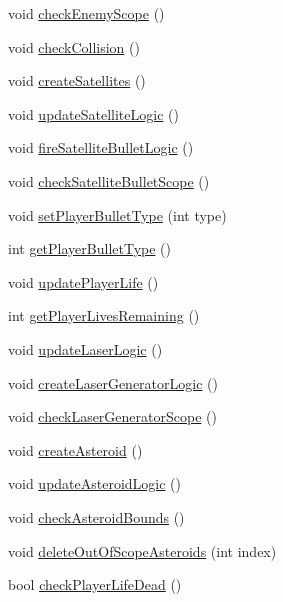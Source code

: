 \begin{DoxyCompactItemize}
\item 
void \hyperlink{class_game_logic_a5c0dc59099b2e223c99fc4a4d51627f0}{check\+Enemy\+Scope} ()
\item 
void \hyperlink{class_game_logic_a2ff25304164107a3f4549f108db95a23}{check\+Collision} ()
\item 
void \hyperlink{class_game_logic_ab2b56581a56239bb837e6eeea0a2991d}{create\+Satellites} ()
\item 
void \hyperlink{class_game_logic_a7d3db89e4d9438756e01b203341dc7c0}{update\+Satellite\+Logic} ()
\item 
void \hyperlink{class_game_logic_ab84e34d803932a798b76f1c3b8a4af83}{fire\+Satellite\+Bullet\+Logic} ()
\item 
void \hyperlink{class_game_logic_a196e25b5a240f8383ce8eab971938fc6}{check\+Satellite\+Bullet\+Scope} ()
\item 
void \hyperlink{class_game_logic_a8463ab82ec024ace6457030f61430fc1}{set\+Player\+Bullet\+Type} (int type)
\item 
int \hyperlink{class_game_logic_a933e3cb807803f40baa6dd8dffedd000}{get\+Player\+Bullet\+Type} ()
\item 
void \hyperlink{class_game_logic_a1737f742ce3b179ea3b5f579a97e7d47}{update\+Player\+Life} ()
\item 
int \hyperlink{class_game_logic_a42fb536e1740b6eeb4f80840250d685f}{get\+Player\+Lives\+Remaining} ()
\item 
void \hyperlink{class_game_logic_ae7b71b5f335308748366385de5c0d88a}{update\+Laser\+Logic} ()
\item 
void \hyperlink{class_game_logic_ae19f7458c9a738410d9c54a393346e35}{create\+Laser\+Generator\+Logic} ()
\item 
void \hyperlink{class_game_logic_ada1e9103a2d46866076c2d3b69c7eaff}{check\+Laser\+Generator\+Scope} ()
\item 
void \hyperlink{class_game_logic_ad9b8589c1559ac09ae5674c5c87be600}{create\+Asteroid} ()
\item 
void \hyperlink{class_game_logic_aefda6025dfef46818697b11f4276dfa6}{update\+Asteroid\+Logic} ()
\item 
void \hyperlink{class_game_logic_a35dcb163c584e620b876def784cbd7a4}{check\+Asteroid\+Bounds} ()
\item 
void \hyperlink{class_game_logic_ae2bb92c22bea679a7467c592f253263b}{delete\+Out\+Of\+Scope\+Asteroids} (int index)
\item 
bool \hyperlink{class_game_logic_a612e0df42ffe7ab590ce5a87c94aa6c9}{check\+Player\+Life\+Dead} ()

\end{DoxyCompactItemize}
